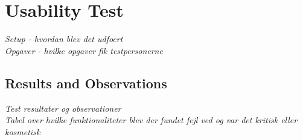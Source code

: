 \section{Usability Test}
\textit{Setup - hvordan blev det udfoert\\
Opgaver - hvilke opgaver fik testpersonerne}

\subsection{Results and Observations}
\textit{Test resultater og observationer\\
Tabel over hvilke funktionaliteter blev der fundet fejl ved og var det kritisk eller kosmetisk}